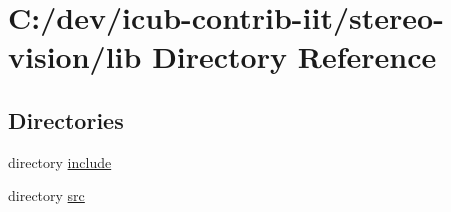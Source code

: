 \section{C\+:/dev/icub-\/contrib-\/iit/stereo-\/vision/lib Directory Reference}
\label{dir_97aefd0d527b934f1d99a682da8fe6a9}
\subsection*{Directories}
\begin{DoxyCompactItemize}
\item 
directory \hyperlink{dir_5a30104352ef4255dc24354b02eb2d20}{include}
\item 
directory \hyperlink{dir_a065c5f60305fee3569f887679366939}{src}
\end{DoxyCompactItemize}
